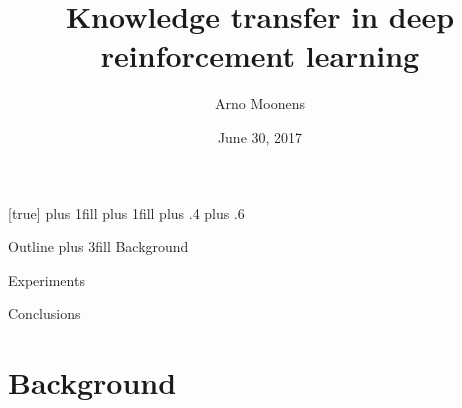 \usepackage{bm} %
\usepackage{hyperref}


\title{Knowledge transfer in deep reinforcement learning}
\author{Arno Moonens}
\date{June 30, 2017}

\makeatletter
{}[true]{%
  \beamer@frametopskip=0pt plus 1fill\relax%
  \beamer@framebottomskip=0pt plus 1fill\relax%
  \beamer@frametopskipautobreak=0pt plus .4\paperheight\relax%
  \beamer@framebottomskipautobreak=0pt plus .6\paperheight\relax%
  \def\beamer@initfirstlineunskip{}%
}
\makeatother

\let\oldfootnotesize\footnotesize
\renewcommand*{\footnotesize}{\oldfootnotesize\tiny}


\AtBeginPart{\frame{\partpage}}

\graphicspath{ {../images/} }

\makeatletter
\def\beamer@framenotesbegin{%
  \gdef\beamer@noteitems{}%
  \gdef\beamer@notes{{}}%
}
\makeatother


\frame{\titlepage}

\begin{frame}{Outline}
    \vskip0pt plus 3fill
  {\color{vubbleu}\large Background}
  \tableofcontents[part=1]

  {\color{vubbleu}\large Experiments}
  \tableofcontents[part=2]

  {\color{vubbleu}\large Conclusions}
  \tableofcontents[part=3]
\end{frame}

\part{Background}

